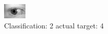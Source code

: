 \begin{figure}[h!]
\begin{center}
\includegraphics[width=0.60\columnwidth]{figures/ID793_class_2_target_4.png}
\end{center}
\caption{ Classification: 2 actual target: 4}
\label{fig:ID793_class_2_target_4}
\end{figure}
